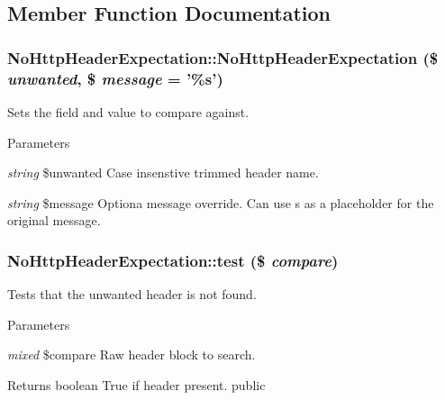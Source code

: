 \subsection{Member Function Documentation}
\hypertarget{class_no_http_header_expectation_a1ec58432436426be602808bded11d776}{
\subsubsection[{NoHttpHeaderExpectation}]{\setlength{\rightskip}{0pt plus 5cm}NoHttpHeaderExpectation::NoHttpHeaderExpectation (\$ {\em unwanted}, \/  \$ {\em message} = {\ttfamily '\%s'})}}
\label{class_no_http_header_expectation_a1ec58432436426be602808bded11d776}
Sets the field and value to compare against. 
\begin{DoxyParams}{Parameters}
\item[{\em string}]\$unwanted Case insenstive trimmed header name. \item[{\em string}]\$message Optiona message override. Can use s as a placeholder for the original message. \end{DoxyParams}
\hypertarget{class_no_http_header_expectation_a3eeb88677fbcc6f33f719aec17d93013}{
\subsubsection[{test}]{\setlength{\rightskip}{0pt plus 5cm}NoHttpHeaderExpectation::test (\$ {\em compare})}}
\label{class_no_http_header_expectation_a3eeb88677fbcc6f33f719aec17d93013}
Tests that the unwanted header is not found. 
\begin{DoxyParams}{Parameters}
\item[{\em mixed}]\$compare Raw header block to search. \end{DoxyParams}
\begin{DoxyReturn}{Returns}
boolean True if header present.  public 
\end{DoxyReturn}


